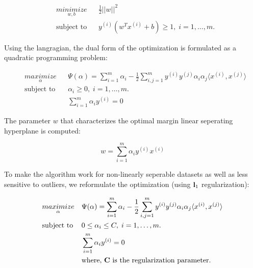 \documentclass{article}
\begin{document}
		\begin{equation*}
			\begin{aligned}
				& \underset{w, b}{minimize}
				& & \frac{1}{2} ||w||^2 \\
				& \text{subject to}
				& & y^{(i)}(w^Tx^{(i)}+b) \geq 1, \; i = 1, \ldots, m.
			\end{aligned}
		\end{equation*}
		
		Using the langragian, the dual form of the optimization is formulated as a quadratic programming problem:
		
		\begin{equation*}
			\begin{aligned}
				& \underset{\alpha}{maximize}
				& & \Psi(\alpha) = \sum_{i=1}^{m} \alpha_i - \frac{1}{2} \sum_{i,j=1}^{m} y^{(i)} y^{(j)} \alpha_i \alpha_j \langle x^{(i)}, x^{(j)} \rangle \\
				& \text{subject to}
				& & \alpha_i \geq 0, \; i=1, \ldots, m. \\
				& & & \sum_{i=1}^{m} \alpha_i y^{(i)} = 0								
			\end{aligned}					
		\end{equation*}
		
		The parameter $w$ that characterizes the optimal margin linear seperating hyperplane is computed:
		
		\begin{equation*}
			w = \sum_{i=1}^{m} \alpha_i y^{(i)} x^{(i)}
		\end{equation*}
				
		To make the algorithm work for non-linearly seperable datasets as well as less sensitive to outliers, we reformulate the optimization (using ${\textbf l_1}$ regularization):
		
		\begin{equation}
			\label{regularised_dual_form}
			\begin{aligned}
				& \underset{\alpha}{maximize}
				& & \Psi(\alpha) = \sum_{i=1}^{m} \alpha_i - \frac{1}{2} \sum_{i,j=1}^{m} y^{(i)} y^{(j)} \alpha_i \alpha_j \langle x^{(i)}, x^{(j)} \rangle \\
				& \text{subject to}
				& & 0 \leq \alpha_i \leq C, \; i=1, \ldots, m. \\
				& & & \sum_{i=1}^{m} \alpha_i y^{(i)} = 0 \\
				& & & \text{where, \textbf{C} is the regularization parameter.}
			\end{aligned}					
		\end{equation}		
		
\end{document}
